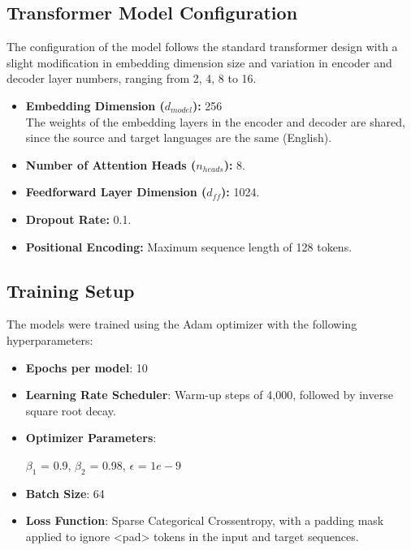 \documentclass[11pt]{article}
\begin{document}
\subsection{Transformer Model Configuration}
The configuration of the model follows the standard transformer design with a slight modification in embedding dimension size and variation in encoder and decoder layer numbers, ranging from 2, 4, 8 to 16. 
\begin{itemize}
    \item \textbf{Embedding Dimension ($d_{model}$):} 256\\ The weights of the embedding layers in the encoder and decoder are shared, since the source and target languages are the same (English).
    \item \textbf{Number of Attention Heads ($n_{heads}$):} 8.
    \item \textbf{Feedforward Layer Dimension ($d_{ff}$):} 1024.
    \item \textbf{Dropout Rate:} 0.1.
    \item \textbf{Positional Encoding:} Maximum sequence length of 128 tokens.
\end{itemize}

\subsection{Training Setup}
The models were trained using the Adam optimizer with the following hyperparameters:
    \begin{itemize}
        \item \textbf{Epochs per model}: 10
        \item \textbf{Learning Rate Scheduler}: Warm-up steps of 4,000, followed by inverse square root decay.
        \item \textbf{Optimizer Parameters}:
            \begin{center}
                $\beta_1$ = 0.9, $\beta_2$ = 0.98, $\epsilon$ = $1e-9$
            \end{center}
        \item \textbf{Batch Size}: 64
        \item \textbf{Loss Function}: Sparse Categorical Crossentropy, with a padding mask applied to ignore <pad> tokens in the input and target sequences.
    \end{itemize}
    
\end{document}
